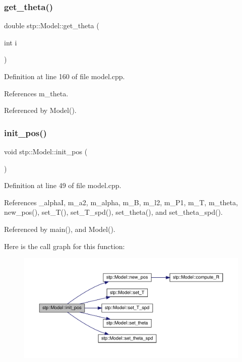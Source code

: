 \subsubsection{\texorpdfstring{get\+\_\+theta()}{get\_theta()}}
{\footnotesize\ttfamily double stp\+::\+Model\+::get\+\_\+theta (\begin{DoxyParamCaption}\item[{int}]{i }\end{DoxyParamCaption})}



Definition at line 160 of file model.\+cpp.



References m\+\_\+theta.



Referenced by Model().

\mbox{\label{classstp_1_1_model_a732e1d29e24600760b53a8e126bb7906}} 
\subsubsection{\texorpdfstring{init\+\_\+pos()}{init\_pos()}}
{\footnotesize\ttfamily void stp\+::\+Model\+::init\+\_\+pos (\begin{DoxyParamCaption}{ }\end{DoxyParamCaption})}



Definition at line 49 of file model.\+cpp.



References \+\_\+alphaI, m\+\_\+a2, m\+\_\+alpha, m\+\_\+B, m\+\_\+l2, m\+\_\+\+P1, m\+\_\+T, m\+\_\+theta, new\+\_\+pos(), set\+\_\+\+T(), set\+\_\+\+T\+\_\+spd(), set\+\_\+theta(), and set\+\_\+theta\+\_\+spd().



Referenced by main(), and Model().

Here is the call graph for this function\+:\nopagebreak
\begin{figure}[H]
\begin{center}
\leavevmode
\includegraphics[width=350pt]{classstp_1_1_model_a732e1d29e24600760b53a8e126bb7906_cgraph}
\end{center}
\end{figure}
\mbox{\label{classstp_1_1_model_a553d9f7f63c97eba26e3522a73531dc1}} 
